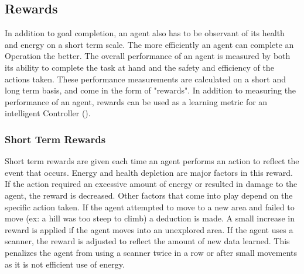 \subsection{Rewards}
In addition to goal completion, an agent also has to be observant of its health and energy on a short term scale.
The more efficiently an agent can complete an Operation the better.
The overall performance of an agent is measured by both its ability to complete the task at hand and the safety and efficiency of the actions taken.
These performance measurements are calculated on a short and long term basis, and come in the form of "rewards".
In addition to measuring the performance of an agent, rewards can be used as a learning metric for an intelligent Controller ().

\subsubsection{Short Term Rewards}
Short term rewards are given each time an agent performs an action to reflect the event that occurs.
Energy and health depletion are major factors in this reward.
If the action required an excessive amount of energy or resulted in damage to the agent, the reward is decreased.
Other factors that come into play depend on the specific action taken.
If the agent attempted to move to a new area and failed to move (ex: a hill was too steep to climb) a deduction is made.
A small increase in reward is applied if the agent moves into an unexplored area.
If the agent uses a scanner, the reward is adjusted to reflect the amount of new data learned.
This penalizes the agent from using a scanner twice in a row or after small movements as it is not efficient use of energy.

